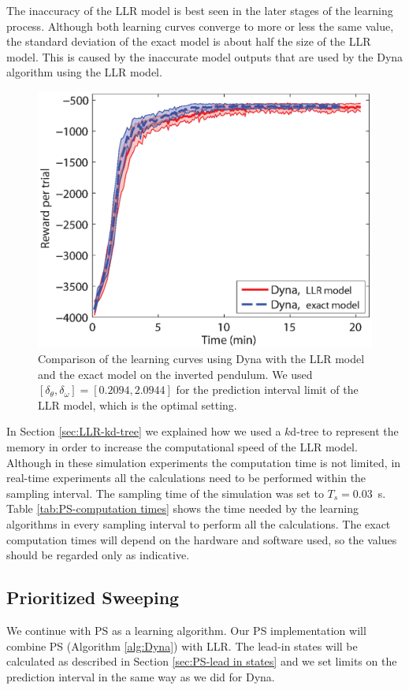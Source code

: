 The inaccuracy of the \ac{LLR} model is best seen in the later stages of the learning process. Although both learning curves converge to more or less the same value, the standard deviation of the exact model is about half the size of the \ac{LLR} model. This is caused by the inaccurate model outputs that are used by the Dyna algorithm using the \ac{LLR} model. 

\begin{figure}[htbp]
	\centering
		\includegraphics[width=.7\textwidth]{figures/PS-DYNA3vsDYNANL}
	\caption[Inverted pendulum: Dyna, \acs{LLR} model compared to exact model]{Comparison of the learning curves using Dyna with the \ac{LLR} model and the exact model on the inverted pendulum. We used $[\delta_\theta,\delta_\omega]=[0.2094, 2.0944]$ for the prediction interval limit of the \ac{LLR} model, which is the optimal setting.}
	\label{fig:PS-DYNA4vsDYNANL}
\end{figure}

In Section \ref{sec:LLR-kd-tree} we explained how we used a $k$d-tree to represent the memory in order to increase the computational speed of the \ac{LLR} model. Although in these simulation experiments the computation time is not limited, in real-time experiments all the calculations need to be performed within the sampling interval. The sampling time of the simulation was set to $T_s = 0.03$~s. Table \ref{tab:PS-computation times} shows the time needed by the learning algorithms in every sampling interval to perform all the calculations. The exact computation times will depend on the hardware and software used, so the values should be regarded only as indicative.

\subsection{Prioritized Sweeping}
We continue with \ac{PS} as a learning algorithm. Our \ac{PS} implementation will combine \ac{PS} (Algorithm \ref{alg:Dyna}) with \ac{LLR}. The lead-in states will be calculated as described in Section \ref{sec:PS-lead in states} and we set limits on the prediction interval in the same way as we did for Dyna. 

